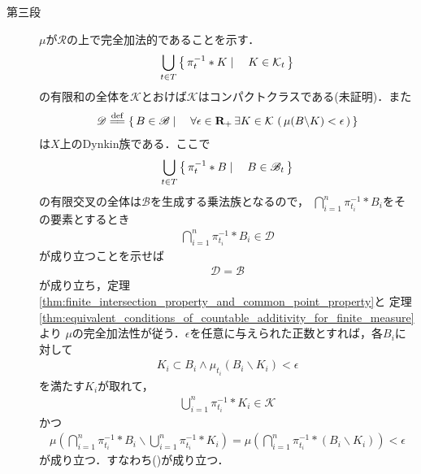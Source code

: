 \begin{prf}
\begin{description}
			\item[第三段]
				$\mu$が$\mathscr{R}$の上で完全加法的であることを示す．
				\begin{align}
					\bigcup_{t \in T} \left\{\, \pi_t^{-1} \ast K \mid \quad K \in \mathcal{K}_t\, \right\}
				\end{align}
				の有限和の全体を$\mathcal{K}$とおけば$\mathcal{K}$はコンパクトクラスである(未証明)．また
				\begin{align}
					\mathscr{D} \defeq 
					\Set{B \in \mathscr{B}}{\forall \epsilon \in \R_+\, \exists K \in \mathcal{K}\, 
					\left(\, \mu(B \backslash K) < \epsilon\, \right)}
				\end{align}
				は$X$上のDynkin族である．ここで
				\begin{align}
					\bigcup_{t \in T} \left\{\, \pi_t^{-1} \ast B \mid \quad B \in \mathscr{B}_t\, \right\}
				\end{align}
				の有限交叉の全体は$\mathscr{B}$を生成する乗法族となるので，
				$\bigcap_{i=1}^n \pi_{t_i}^{-1} \ast B_i$をその要素とするとき
				\begin{align}
					\bigcap_{i=1}^n \pi_{t_i}^{-1} \ast B_i \in \mathscr{D}
					\label{Kolmogorov_extension_theorem_1}
				\end{align}
				が成り立つことを示せば
				\begin{align}
					\mathscr{D} = \mathscr{B}
				\end{align}
				が成り立ち，定理\ref{thm:finite_intersection_property_and_common_point_property}と
				定理\ref{thm:equivalent_conditions_of_countable_additivity_for_finite_measure}より
				$\mu$の完全加法性が従う．$\epsilon$を任意に与えられた正数とすれば，各$B_i$に対して
				\begin{align}
					K_i \subset B_i \wedge \mu_{t_i}(B_i \backslash K_i) < \epsilon
				\end{align}
				を満たす$K_i$が取れて，
				\begin{align}
					\bigcup_{i=1}^n \pi_{t_i}^{-1} \ast K_i \in \mathcal{K}
				\end{align}
				かつ
				\begin{align}
					\mu\left( \bigcap_{i=1}^n \pi_{t_i}^{-1} \ast B_i \backslash 
					\bigcup_{i=1}^n \pi_{t_i}^{-1} \ast K_i \right)
					= \mu\left( \bigcap_{i=1}^n \pi_{t_i}^{-1} \ast (B_i \backslash K_i) \right)
					< \epsilon
				\end{align}
				が成り立つ．すなわち()が成り立つ．
				\QED
		\end{description}
	\end{prf}